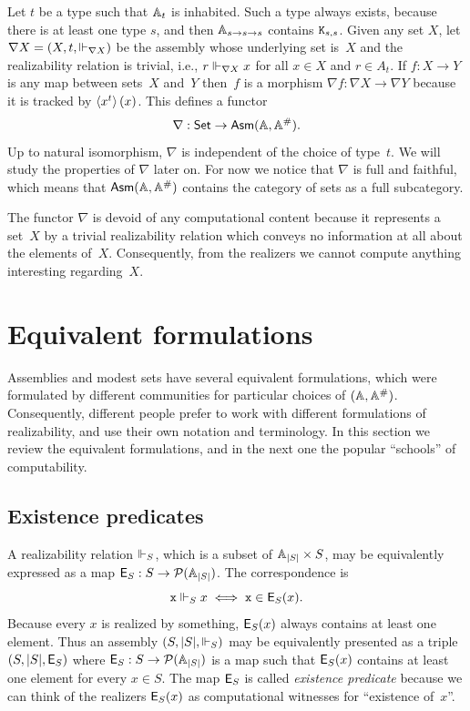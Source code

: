 Let $t$ be a type such that $\mathbb{A}_{t}$ is inhabited. Such a type
always exists, because there is at least one type $s$, and then
$\mathbb{A}_{s \to s \to s}$ contains $\mathtt{K}_{s,s}$. Given any set $X$, let
$\nabla X = (X, t, {\Vdash_{\nabla X}})$ be the assembly whose underlying
set is~$X$ and the realizability relation is trivial, i.e., $r
\Vdash_{\nabla X} x$ for all $x \in X$ and $r \in A_t$. If $f : X \to Y$
is any map between sets~$X$ and~$Y$ then~$f$ is a morphism $\nabla f :
\nabla X \to \nabla Y$ because it is tracked by
$\langle x^{t} \rangle\,(x)$. This defines a functor
%
\begin{equation*}
  \nabla : \mathsf{Set} \to \mathsf{Asm}(\mathbb{A},\mathbb{A}^{\#}).
\end{equation*}
%
Up to natural isomorphism, $\nabla$ is independent of the choice of
type~$t$. We will study the properties of $\nabla$ later on. For now
we notice that $\nabla$ is full and faithful, which means that
$\mathsf{Asm}(\mathbb{A},\mathbb{A}^{\#})$ contains the category of sets as a full
subcategory.

The functor $\nabla$ is devoid of any computational content because it
represents a set~$X$ by a trivial realizability relation which conveys
no information at all about the elements of~$X$. Consequently, from
the realizers we cannot compute anything interesting regarding~$X$.


\section{Equivalent formulations}
\label{sec:equivalent-formulations}

Assemblies and modest sets have several equivalent formulations, which
were formulated by different communities for particular choices of
$(\mathbb{A}, \mathbb{A}^{\#})$. Consequently, different people prefer to work with
different formulations of realizability, and use their own notation
and terminology. In this section we review the equivalent
formulations, and in the next one the popular ``schools'' of
computability.

\subsection{Existence predicates}
\label{sec:existence-predicates}

A realizability relation $\Vdash_S$, which is a subset of $\mathbb{A}_{|S|}
\times S$, may be equivalently expressed as a map $\mathsf{E}_S : S \to
\mathcal{P}(\mathbb{A}_{|S|})$. The correspondence is
%
\begin{equation*}
  \mathtt{x} \Vdash_S x \iff \mathtt{x} \in \mathsf{E}_S(x).
\end{equation*}
%
Because every $x$ is realized by something, $\mathsf{E}_S(x)$ always contains
at least one element. Thus an assembly $(S, |S|, {\Vdash_{S}})$ may be equivalently
presented as a triple $(S, |S|, \mathsf{E}_S)$ where $\mathsf{E}_S : S \to
\mathcal{P}(\mathbb{A}_{|S|})$ is a map such that $\mathsf{E}_S(x)$ contains at least one
element for every $x \in S$. The map $\mathsf{E}_S$ is called \emph{existence
  predicate} because we can think of the realizers $\mathsf{E}_S(x)$ as
computational witnesses for ``existence of~$x$''.

